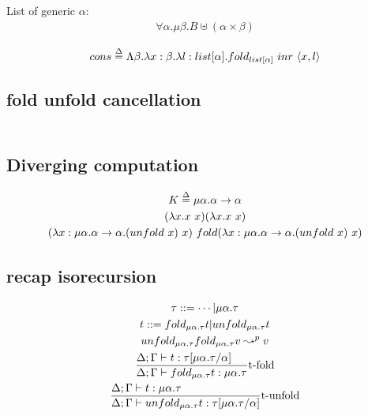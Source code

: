 \documentclass{article}
\begin{document}
List of generic $\alpha$:
\begin{align*}
    \forall\alpha.\mu\beta.B\uplus(\alpha\times\beta)
\end{align*}


\begin{align*}
    cons \overset\Delta= \Lambda\beta.\lambda x:\beta.\lambda l:list[\alpha].fold_{list[\alpha]}\ inr\ \langle x, l\rangle
\end{align*}

\subsection{fold unfold cancellation}
\begin{gather*}
\end{gather*}

\subsection{Diverging computation}
\begin{gather*}
    K \overset\Delta= \mu\alpha.\alpha\to\alpha \\
    (\lam{x}{x\ x})(\lam{x}{x\ x}) \\
    (\lam{x:\mu\alpha.\alpha\to\alpha}{(unfold\ x)\ x})\ fold(\lam{x:\mu\alpha.\alpha\to\alpha}{(unfold\ x)\ x})
\end{gather*}

\subsection{recap isorecursion}
\begin{gather*}
    \tau ::= \cdots | \mu\alpha.\tau \\
    t ::= fold_{\mu\alpha.\tau}t | unfold_{\mu\alpha.\tau}t \\
    unfold_{\mu\alpha.\tau}fold_{\mu\alpha.\tau}v\leadsto^p v \\
    \st[t-fold]{
        \Delta;\Gamma\vdash fold_{\mu\alpha.\tau} t : \mu\alpha.\tau
    }{
        \Delta;\Gamma\vdash t:\tau[\mu\alpha.\tau/\alpha]
    } \\
    \st[t-unfold]{
        \Delta;\Gamma\vdash unfold_{\mu\alpha.\tau}t:\tau[\mu\alpha.\tau/\alpha]
    }{
        \Delta;\Gamma\vdash t:\mu\alpha.\tau
    } \\
\end{gather*}
\end{document}
